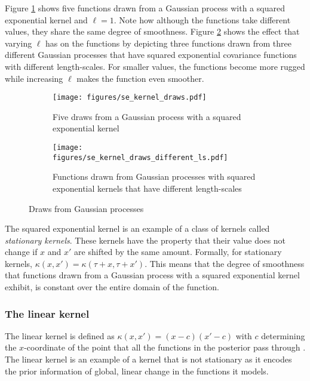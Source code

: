 \documentclass[a4paper,12pt,twoside,openright]{report}
\begin{document}
Figure \ref{sekernel_draws} shows five functions drawn from a Gaussian process with a squared exponential kernel and $\ell = 1$. Note how although the functions take different values, they share the same degree of smoothness. Figure \ref{sekernel_draws_different_ls} shows the effect that varying $\ell$ has on the functions by depicting three functions drawn from three different Gaussian processes that have squared exponential covariance functions with different length-scales. For smaller values, the functions become more rugged while increasing $\ell$ makes the function even smoother.

\begin{figure}[h]
\centering
\begin{subfigure}{.45\textwidth}
\centering
  \texttt{[image: figures/se\_kernel\_draws.pdf]}
  \caption{Five draws from a Gaussian process with a squared exponential kernel}
  \label{sekernel_draws}
\end{subfigure}
\begin{subfigure}{.45\textwidth}
\centering
  \texttt{[image: figures/se\_kernel\_draws\_different\_ls.pdf]}
  \caption{Functions drawn from Gaussian processes with squared exponential kernels that have different length-scales}
  \label{sekernel_draws_different_ls}
\end{subfigure}
\caption{Draws from Gaussian processes}
\label{se_gp_draws}
\end{figure}

The squared exponential kernel is an example of a class of kernels called \emph{stationary kernels}. These kernels  have the property that their value does not change if $x$ and $x'$ are shifted by the same amount. Formally, for stationary kernels, $\kappa(x, x') = \kappa(\tau + x, \tau + x')$. This means that the degree of smoothness that functions drawn from a Gaussian process with a squared exponential kernel exhibit, is constant over the entire domain of the function.


\subsubsection{The linear kernel}
The linear kernel is defined as $\kappa(x, x') = (x-c)(x'-c)$ with $c$ determining the $x$-coordinate of the point that all the functions in the posterior pass through \cite{duvenaudthesis}. The linear kernel is an example of a kernel that is not stationary as it encodes the prior information of global, linear change in the functions it models.
\end{document}
